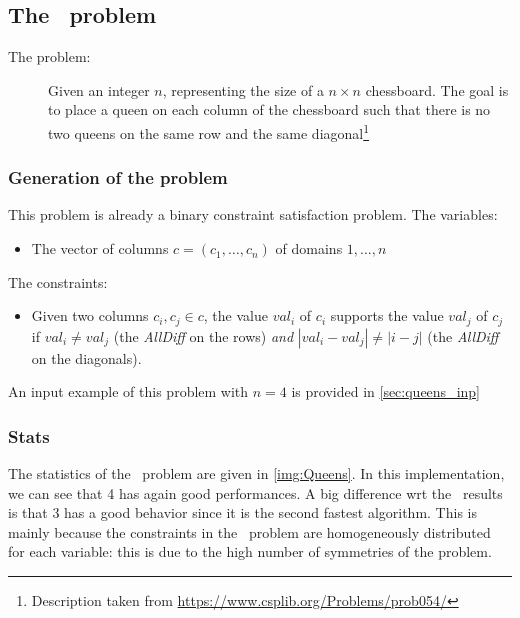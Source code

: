 \documentclass{rapport}
\begin{document}
\subsection{The \queens\ problem}

\begin{description}
  \item[The problem:] Given an integer $n$, representing the size of a $n \times n$ chessboard. The goal is to place a queen on each column of the chessboard such that there is no two queens on the same row and the same diagonal\footnote{Description taken from \url{https://www.csplib.org/Problems/prob054/}}
\end{description}

\subsubsection{Generation of the problem}

This problem is already a binary constraint satisfaction problem.
The variables:
\begin{itemize}
  \item The vector of columns $c = (c_1, \dots, c_n)$ of domains $1, \dots, n$
\end{itemize}

The constraints:
\begin{itemize}
  \item Given two columns $c_i, c_j \in c$, the value $val_i$ of $c_i$ supports the value $val_j$ of $c_j$ if $val_i \neq val_j$ (the \textit{AllDiff} on the rows) \textit{and} $|val_i - val_j| \neq |i - j|$ (the \textit{AllDiff} on the diagonals).
\end{itemize}

An input example of this problem with $n = 4$ is provided in \cref{sec:queens_inp}

\subsubsection{Stats}

The statistics of the \queens\ problem are given in \cref{img:Queens}. In this implementation, we can see that \ac{4} has again good performances. A big difference wrt the \allint\ results is that \ac{3} has a good behavior since it is the second fastest algorithm. This is mainly because the constraints in the \queens\ problem are homogeneously distributed for each variable: this is due to the high number of symmetries of the problem.
\end{document}

